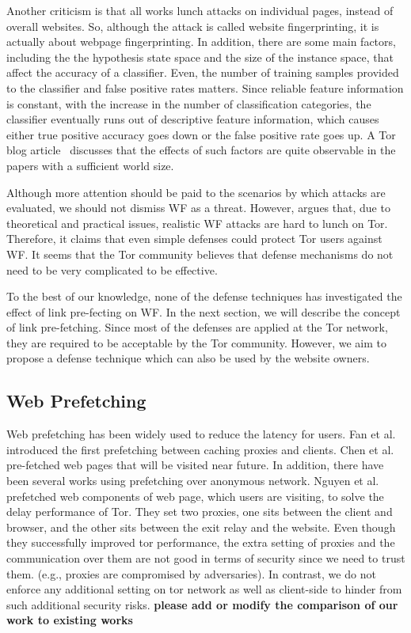 Another criticism is that all works lunch attacks on individual pages, instead of overall websites.
So, although the attack is called website fingerprinting, it is actually about webpage fingerprinting.
In addition, there are some main factors, including the the hypothesis state space and the size of the instance space, that affect the accuracy of a classifier.
Even, the number of training samples provided to the classifier and false positive rates matters.
Since reliable feature information is constant, with the increase in the number of classification categories, the classifier eventually runs out of descriptive feature information, which causes either true positive accuracy goes down or the false positive rate goes up.
A Tor blog article~\cite{TorBlog} discusses that the effects of such factors are quite observable in the papers with a sufficient world size.

Although more attention should be paid to the scenarios by which attacks are evaluated, we should not dismiss WF as a threat. However, \cite{TorBlog} argues that, due to theoretical and practical issues, realistic WF attacks are hard to lunch on Tor. Therefore, it claims that even simple defenses could protect Tor users against WF. It seems that the Tor community believes that defense mechanisms do not need to be very complicated to be effective.

To the best of our knowledge, none of the defense techniques has investigated the effect of link pre-fecting on WF. In the next section, we will describe the concept of link pre-fetching. Since most of the defenses are applied at the Tor network, they are required to be acceptable by the Tor community. However, we aim to propose a defense technique which can also be used by the website owners. 


\subsection{Web Prefetching}

Web prefetching has been widely used to reduce the latency for users. Fan et al.\cite{Fan1999} introduced the first prefetching between caching proxies and clients. Chen et al. \cite{Chen2003} pre-fetched web pages that will be visited near future. In addition, there have been several works using prefetching over anonymous network. Nguyen et al. \cite{} prefetched web components of web page, which users are visiting, to solve the delay performance of Tor. They set two proxies, one sits between the client and browser, and the other sits between the exit relay and the website. Even though they successfully improved tor performance, the extra setting of proxies and the communication over them are not good in terms of security since we need to trust them. (e.g., proxies are compromised by adversaries). In contrast, we do not enforce any additional setting on tor network as well as client-side to hinder from such additional security risks.  \textbf{please add  or modify the comparison of our work to existing works}

